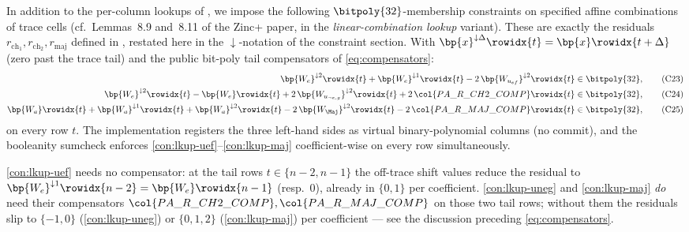 In addition to the per-column lookups of , we
impose the following $\bitpoly{32}$-membership constraints on
specified affine combinations of trace cells (cf.\ Lemmas~8.9
and~8.11 of the Zinc+ paper, in the \emph{linear-combination lookup}
variant). These are exactly the residuals
$r_{\mathrm{ch}_1}, r_{\mathrm{ch}_2}, r_{\mathrm{maj}}$ defined in
, restated here in the $\downarrow$-notation of the
constraint section. With $\bp{x}^{\downarrow\Delta}\rowidx{t} = \bp{x}\rowidx{t+\Delta}$
(zero past the trace tail) and the public bit-poly tail compensators
of \eqref{eq:compensators}:
\begin{align}
\bp{W_e}^{\downarrow 2}\rowidx{t} + \bp{W_e}^{\downarrow 1}\rowidx{t} - 2\,\bp{W_{u_{ef}}}^{\downarrow 2}\rowidx{t} &\in \bitpoly{32}, \tag{C23}\label{con:lkup-uef}\\
\bp{W_e}^{\downarrow 2}\rowidx{t} - \bp{W_e}\rowidx{t} + 2\,\bp{W_{u_{\neg e,g}}}^{\downarrow 2}\rowidx{t} + 2\,\col{PA\_R\_CH2\_COMP}\rowidx{t} &\in \bitpoly{32}, \tag{C24}\label{con:lkup-uneg}\\
\bp{W_a}\rowidx{t} + \bp{W_a}^{\downarrow 1}\rowidx{t} + \bp{W_a}^{\downarrow 2}\rowidx{t} - 2\,\bp{W_{\Maj}}^{\downarrow 2}\rowidx{t} - 2\,\col{PA\_R\_MAJ\_COMP}\rowidx{t} &\in \bitpoly{32}, \tag{C25}\label{con:lkup-maj}
\end{align}
on every row $t$. The implementation registers the three left-hand
sides as virtual binary-polynomial columns (no commit), and the
booleanity sumcheck enforces \ref{con:lkup-uef}--\ref{con:lkup-maj}
coefficient-wise on every row simultaneously.

\ref{con:lkup-uef} needs no compensator: at the tail rows
$t \in \{n-2, n-1\}$ the off-trace shift values reduce the residual
to $\bp{W_e}^{\downarrow 1}\rowidx{n-2} = \bp{W_e}\rowidx{n-1}$ (resp.\ $0$),
already in $\{0,1\}$ per coefficient. \ref{con:lkup-uneg} and
\ref{con:lkup-maj} \emph{do} need their compensators
$\col{PA\_R\_CH2\_COMP}, \col{PA\_R\_MAJ\_COMP}$ on those two tail
rows; without them the residuals slip to $\{-1, 0\}$
(\ref{con:lkup-uneg}) or $\{0, 1, 2\}$ (\ref{con:lkup-maj}) per
coefficient — see the discussion preceding \eqref{eq:compensators}.

